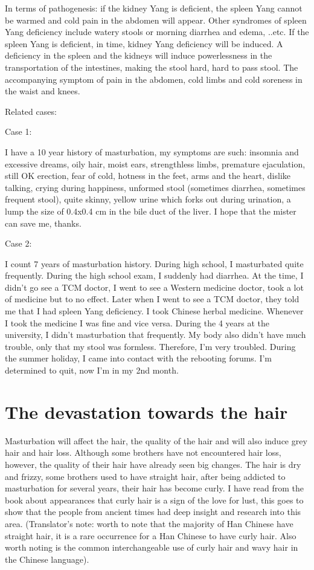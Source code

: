 \documentclass[
]{book}
\begin{document}
In terms of pathogenesis: if the kidney Yang is deficient, the spleen Yang cannot be warmed and cold pain in the abdomen will appear. Other syndromes of spleen Yang deficiency include watery stools or morning diarrhea and edema, ..etc. If the spleen Yang is deficient, in time, kidney Yang deficiency will be induced. A deficiency in the spleen and the kidneys will induce powerlessness in the transportation of the intestines, making the stool hard, hard to pass stool. The accompanying symptom of pain in the abdomen, cold limbs and cold soreness in the waist and knees.

Related cases:

Case 1:

I have a 10 year history of masturbation, my symptoms are such: insomnia and excessive dreams, oily hair, moist ears, strengthless limbs, premature ejaculation, still OK erection, fear of cold, hotness in the feet, arms and the heart, dislike talking, crying during happiness, unformed stool (sometimes diarrhea, sometimes frequent stool), quite skinny, yellow urine which forks out during urination, a lump the size of 0.4x0.4 cm in the bile duct of the liver. I hope that the mister can save me, thanks.

Case 2:

I count 7 years of masturbation history. During high school, I masturbated quite frequently. During the high school exam, I suddenly had diarrhea. At the time, I didn't go see a TCM doctor, I went to see a Western medicine doctor, took a lot of medicine but to no effect. Later when I went to see a TCM doctor, they told me that I had spleen Yang deficiency. I took Chinese herbal medicine. Whenever I took the medicine I was fine and vice versa. During the 4 years at the university, I didn't masturbation that frequently. My body also didn't have much trouble, only that my stool was formless. Therefore, I'm very troubled. During the summer holiday, I came into contact with the rebooting forums. I'm determined to quit, now I'm in my 2nd month.

\hypertarget{the-devastation-towards-the-hair}{%
\section{The devastation towards the hair}\label{the-devastation-towards-the-hair}}

Masturbation will affect the hair, the quality of the hair and will also induce grey hair and hair loss. Although some brothers have not encountered hair loss, however, the quality of their hair have already seen big changes. The hair is dry and frizzy, some brothers used to have straight hair, after being addicted to masturbation for several years, their hair has become curly. I have read from the book about appearances that curly hair is a sign of the love for lust, this goes to show that the people from ancient times had deep insight and research into this area. (Translator's note: worth to note that the majority of Han Chinese have straight hair, it is a rare occurrence for a Han Chinese to have curly hair. Also worth noting is the common interchangeable use of curly hair and wavy hair in the Chinese language).
\end{document}
